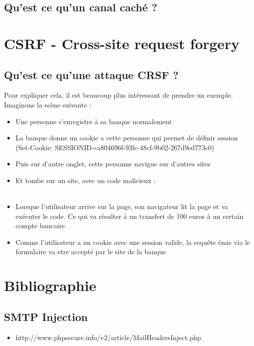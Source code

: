 \documentclass{article}
\begin{document}
\subsection{Qu'est ce qu'un canal caché ?}

\newpage
\section{CSRF - Cross-site request forgery}
\subsection{Qu'est ce qu'une attaque CRSF ?}
Pour expliquer cela, il est beaucoup plus intéressant de prendre un exemple. Imaginons la scène suivante :\\
\begin{itemize}
\item Une personne s'enregistre à sa banque normalement\\
\item La banque donne un cookie a cette personne qui permet de définir session\\
 (Set-Cookie: SESSIONID=a804696f-93fc-48cf-9b02-267d9ed773c0)\\
\item Puis sur d'autre onglet, cette personne navigue sur d'autres sites\\
\item Et tombe sur un site, avec un code malicieux :\\
\\
\item Lorsque l'utilisateur arrive sur la page, son navigateur lit la page et va exécuter le code. Ce qui va résulter à un transfert de 100 euros à un certain compte bancaire\\
\item Comme l'utilisateur a un cookie avec une session valide, la requête émis via le formulaire va etre accepté par le site de la banque
\end{itemize}

\newpage
\section{Bibliographie}
\subsection{SMTP Injection}
\begin{itemize}
\item http://www.phpsecure.info/v2/article/MailHeadersInject.php
\end{itemize}
\end{document}
